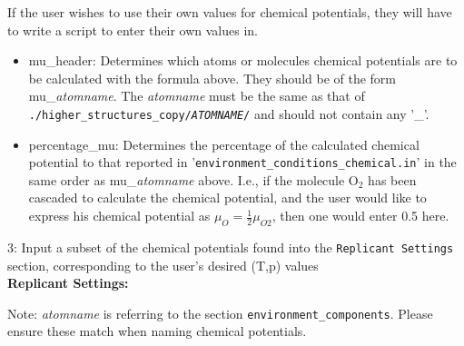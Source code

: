If the user wishes to use their own values for chemical potentials, they will have to write a script to enter their own values in.

\begin{itemize}

\item mu\_header: Determines which atoms or molecules chemical potentials are to be calculated with the formula above. They should be of the form mu\_{\em atomname}. The {\em atomname} must be the same as that of \texttt{./higher\_structures\_copy/{\em ATOMNAME}/} and should not contain any '\_'.

\item percentage\_mu: Determines the percentage of the calculated chemical potential to that reported in '\texttt {environment\_conditions\_chemical.in}' in the same order as mu\_{\em atomname} above. I.e., if the molecule O$_2$ has been cascaded to calculate the chemical potential, and the user would like to express his chemical potential as $\mu_O = \frac{1}{2}\mu_{O2}$, then one would enter 0.5 here.

\end{itemize}

3: Input a subset of the chemical potentials found into the \texttt{Replicant Settings} section, corresponding to the user's desired (T,p) values\\

\textbf{Replicant Settings:}

Note: {\em atomname} is referring to the section \texttt{environment\_components}. Please ensure these match when naming chemical potentials.

